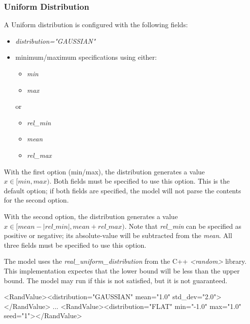 \documentclass[11pt,fleqn]{report}
\begin{document}
\subsubsection {Uniform Distribution}
A Uniform distribution is configured with the following fields:
\begin{itemize}
\item \textit{distribution="GAUSSIAN"}
\item minimum/maximum specifications using either:
  \begin{itemize}
  \item \textit{min}
  \item \textit{max}
  \end{itemize}
  or
  \begin{itemize}
  \item \textit{rel\_min}
  \item \textit{mean}
  \item \textit{rel\_max}
  \end{itemize}
\end{itemize}
With the first option (min/max), the distribution generates a value
$x \in [min, max)$.
Both fields must be specified to use this option. This is the default
option; if both fields are specified, the model will not parse the contents
for the second option.

With the second option, the distribution generates a value
$x \in [mean - |rel\_min|, mean + rel\_max)$. Note that \textit{rel\_min}
can be specified as positive or negative; its absolute-value will be
subtracted from the \textit{mean}. All three fields must be specified to use
this option.

The model uses the \textit{real\_uniform\_distribution} from the C++
\textit{<random>} library. This implementation expectes that the lower bound
will be less than the upper bound. The model may run if this is not
satisfied, but it is not guaranteed.

\begin{codeXML}
<RandValue><distribution="GAUSSIAN" mean="1.0" std_dev="2.0"></RandValue>
...
<RandValue><distribution="FLAT" min="-1.0" max="1.0" seed="1"></RandValue>
\end{codeXML}
\end{document}
